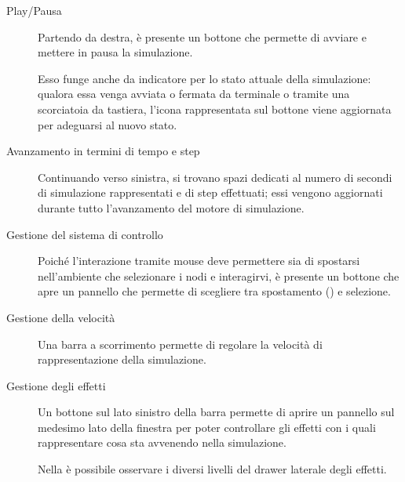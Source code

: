        \begin{description}
            \item [Play/Pausa]
                Partendo da destra, è presente un bottone che permette di avviare e mettere in pausa la simulazione.

                Esso funge anche da indicatore per lo stato attuale della simulazione:
                qualora essa venga avviata o fermata da terminale o tramite una scorciatoia da tastiera, l'icona rappresentata sul bottone viene aggiornata per adeguarsi al nuovo stato.

            \item[Avanzamento in termini di tempo e step]
                Continuando verso sinistra, si trovano spazi dedicati al numero di secondi di simulazione rappresentati e di step effettuati;
                essi vengono aggiornati durante tutto l'avanzamento del motore di simulazione.

            \item[Gestione del sistema di controllo]
                Poiché l'interazione tramite mouse deve permettere sia di spostarsi nell'ambiente che selezionare i nodi e interagirvi, è presente un bottone che apre un pannello che permette di scegliere tra spostamento () e selezione.

            \item[Gestione della velocità]
                Una barra a scorrimento permette di regolare la velocità di rappresentazione della simulazione.

            \item[Gestione degli effetti]
                Un bottone sul lato sinistro della barra permette di aprire un pannello sul medesimo lato della finestra per poter controllare gli effetti con i quali rappresentare cosa sta avvenendo nella simulazione.

                Nella  è possibile osservare i diversi livelli del drawer laterale degli effetti.


\end{description}
